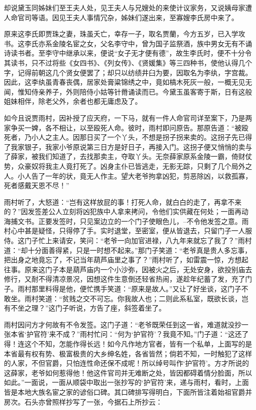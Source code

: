 \documentclass[12pt,oneside]{book}
\begin{document}
却说黛玉同姊妹们至王夫人处，见王夫人与兄嫂处的来使计议家务，又说姨母家遭人命官司等语。因见王夫人事情冗杂，姊妹们遂出来，至寡嫂李氏房中来了。

原来这李氏即贾珠之妻，珠虽夭亡，幸存一子，取名贾蘭，今方五岁，已入学攻书。这李氏亦系金陵名宦之女，父名李守中，曾为国子监祭酒，族中男女无有不诵诗读书者。至李守中继承以来，便说“女子无才便有德”，故生李氏时，便不十分令其读书，只不过将些《女四书》、《列女传》、《贤媛集》等三四种书，使他认得几个字，记得前朝这几个贤女便罢了；却只以纺绩井臼为要，因取名为李纨，字宫裁。因此，这李纨虽青春丧偶，居家处膏粱锦绣之中，竟如槁木死灰一般，一概无见无闻，惟知侍亲养子，外则陪侍小姑等针黹诵读而已。今黛玉虽客寄于斯，日有这般姐妹相伴，除老父外，余者也都无庸虑及了。

如今且说贾雨村，因补授了应天府，一下马，就有一件人命官司详至案下，乃是两家争买一婢，各不相让，以至殴死人命。彼时，雨村即问原告。那原告道：“被殴死者，乃小人之主人。因那日买了一个丫头，不想是拐子拐来卖的。这拐子先已得了我家银子，我家小爷原说第三日方是好日子，再接入门。这拐子便又悄悄的卖与了薛家，被我们知道了，去找那卖主，夺取丫头。无奈薛家原系金陵一霸，倚财仗势，众豪奴将我主人竟打死了。凶身主仆已皆逃走，无影无踪，只剩了几个局外之人。小人告了一年的状，竟无人作主。望大老爷拘拿凶犯，剪恶除凶，以救孤寡，死者感戴天恩不尽！”

雨村听了，大怒道：“岂有这样放屁的事！打死人命，就白白的走了，再拿不来的？”因发签差公人立刻将凶犯族中人拿来拷问，令他们实供藏在何处；一面再动海捕文书。正要发签时，只见案边立的一个门子使眼色儿，--不令他发签之意。雨村心中甚是疑怪，只得停了手。实时退堂，至密室，便从皆退去，只留门子一人服侍。这门子忙上来请安，笑问：“老爷一向加官进禄，八九年来就忘了我了？”雨村道：“却十分面善得紧，只是一时想不起来。”那门子笑道：“老爷真是贵人多忘事，把出身之地竟忘了，不记当年葫芦庙里之事了？”雨村听了，如雷震一惊，方想起往事。原来这门子本是葫芦庙内一个小沙弥，因被火之后，无处安身，欲投别庙去修行，又耐不得清凉景况，因想这件生意倒还轻省热闹，遂趁年纪蓄了发，充了门子。雨村那里料得是他，便忙携手笑道：“原来是故人。”又让了好坐谈，这门子不敢坐。雨村笑道：“贫贱之交不可忘。你我故人也；二则此系私室，既欲长谈，岂有不坐之理？”这门子听说，方告了座，斜签着坐了。

雨村因问方才何故有不令发签。这门子道：“老爷既荣任到这一省，难道就没抄一张本省‘护官符’来不成？”雨村忙问：“何为‘护官符’？我竟不知。”门子道：“这还了得！连这个不知，怎能作得长远！如今凡作地方官者，皆有一个私单，上面写的是本省最有权有势、极富极贵的大乡绅名姓，各省皆然；倘若不知，一时触犯了这样的人家，不但官爵，只怕连性命还保不成呢！所以绰号叫作‘护官符’。方才所说的这薛家，老爷如何惹得他！他这件官司并无难断之处，皆因都碍着情分脸面，所以如此。”一面说，一面从顺袋中取出一张抄写的‘护官符’来，递与雨村，看时，上面皆是本地大族名宦之家的谚俗口碑。其口碑排写得明白，下面所皆注着始祖官爵并房次。石头亦曾照样抄写了一张，今据石上所抄云：
\end{document}
